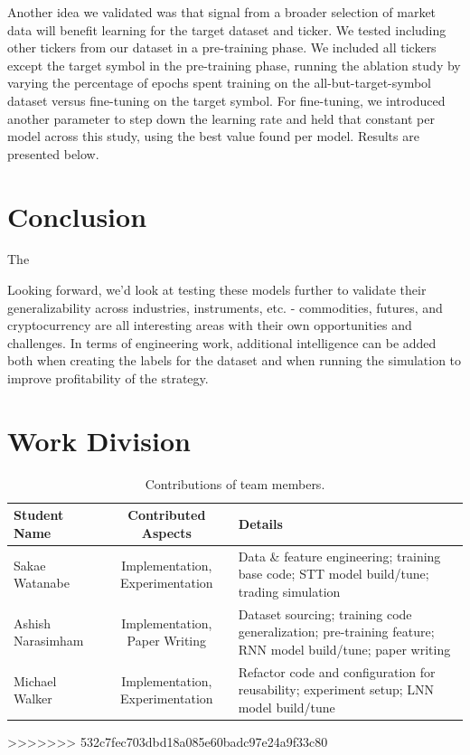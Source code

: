\documentclass[10pt,twocolumn,letterpaper]{article}
\begin{document}
Another idea we validated was that signal from a broader selection of market data will benefit learning for the target dataset and ticker. We tested including other tickers from our dataset in a pre-training phase. We included all tickers except the target symbol in the pre-training phase, running the ablation study by varying the percentage of epochs spent training on the all-but-target-symbol dataset versus fine-tuning on the target symbol. For fine-tuning, we introduced another parameter to step down the learning rate and held that constant per model across this study, using the best value found per model.  Results are presented below.


\section{Conclusion}

The

Looking forward, we’d look at testing these models further to validate their generalizability across industries, instruments, etc. - commodities, futures, and cryptocurrency are all interesting areas with their own opportunities and challenges. In terms of engineering work, additional intelligence can be added both when creating the labels for the dataset and when running the simulation to improve profitability of the strategy.


\section{Work Division}

\begin{table}
\begin{center}
\begin{tabular}{|l|c|p{8cm}|}
\hline
Student Name & Contributed Aspects & Details \\
\hline\hline
Sakae Watanabe & Implementation, Experimentation & Data \& feature engineering; training base code; STT model build/tune; trading simulation\\
Ashish Narasimham & Implementation, Paper Writing & Dataset sourcing; training code generalization; pre-training feature; RNN model build/tune; paper writing \\
Michael Walker & Implementation, Experimentation & Refactor code and configuration for reusability; experiment setup; LNN model build/tune \\
\hline
\end{tabular}
\end{center}
\caption{Contributions of team members.}
\label{tab:contributions}
\end{table}
>>>>>>> 532c7fec703dbd18a085e60badc97e24a9f33c80
\end{document}
